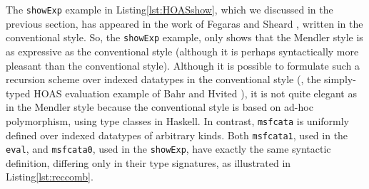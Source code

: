 The \lstinline{showExp} example in Listing\;\ref{lst:HOASshow},
which we discussed in the previous section, has appeared in the work
of Fegaras and Sheard \cite{FegShe96}, written in the conventional style.
So, the \lstinline{showExp} example, only shows that the Mendler style is
as expressive as the conventional style (although it is
perhaps syntactically more pleasant than the conventional style).
Although it is possible to formulate such a recursion scheme over
indexed datatypes in the conventional style (\eg, the simply-typed HOAS
evaluation example of Bahr and Hvited \cite{BahHvi12}), it is not quite
elegant as in the Mendler style because the conventional style is based on
ad-hoc polymorphism, using type classes in Haskell. In contrast,
\lstinline{msfcata} is uniformly defined over indexed datatypes of
arbitrary kinds. Both \lstinline{msfcata1}, used in the \lstinline{eval},
and \lstinline{msfcata0}, used in the \lstinline{showExp}, have exactly
the same syntactic definition, differing only in their type signatures,
as illustrated in Listing\;\ref{lst:reccomb}.
